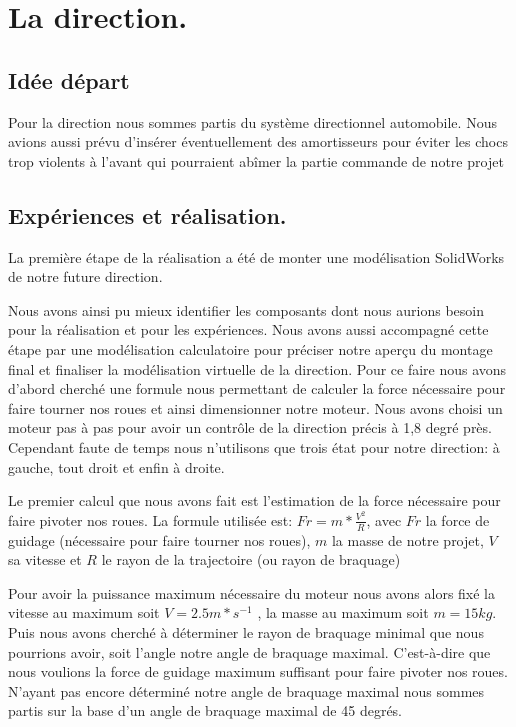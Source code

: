\chapter{La direction.}

\section{Idée départ} 
Pour la direction nous sommes partis du système directionnel automobile.  Nous avions aussi prévu d’insérer éventuellement des amortisseurs pour éviter les chocs trop violents à l’avant qui pourraient abîmer la partie commande de notre projet

\section{Expériences et réalisation.}
La première étape de la réalisation a été de monter une modélisation SolidWorks de notre future direction. 

Nous avons ainsi pu mieux identifier les composants dont nous aurions besoin pour la réalisation et pour les expériences. Nous avons aussi accompagné cette étape par  une modélisation  calculatoire pour préciser notre aperçu du montage final et finaliser la modélisation virtuelle de la direction.
Pour ce faire nous avons d’abord cherché une formule nous permettant de calculer la force nécessaire pour faire tourner nos roues et ainsi dimensionner notre moteur. Nous avons choisi un moteur pas à pas pour avoir un contrôle de la direction précis à 1,8 degré près. Cependant faute de temps nous n’utilisons que trois état pour notre direction: à gauche, tout droit et enfin à droite.

Le premier calcul que nous avons fait est l’estimation de la force nécessaire pour faire pivoter nos roues. La formule utilisée est: $Fr = m * \frac{V^2}{R}$,  avec $Fr$ la force de guidage  (nécessaire pour faire tourner nos roues),  $m$ la masse de notre projet, $V$ sa vitesse et $R$ le rayon de la trajectoire (ou rayon de braquage)

Pour avoir la puissance maximum nécessaire du moteur nous avons alors fixé la vitesse au maximum soit $V=2.5m*s^{-1}$ ,  la masse au maximum soit $m= 15kg$. Puis nous avons cherché à déterminer le rayon de braquage minimal que nous pourrions avoir, soit l’angle notre angle de braquage maximal. C’est-à-dire que nous voulions la force de guidage maximum suffisant pour faire pivoter nos roues. N’ayant pas encore déterminé notre angle de braquage maximal nous sommes partis sur la base d’un angle de braquage maximal de 45 degrés. 

